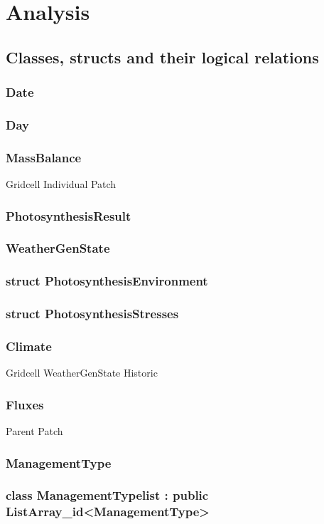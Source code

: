\section{Analysis}
\subsection{Classes, structs and their logical relations}

\subsubsection{Date}
\subsubsection{Day}
\subsubsection{MassBalance}
Gridcell
Individual
Patch
\subsubsection{PhotosynthesisResult}
\subsubsection{WeatherGenState}
\subsubsection{struct PhotosynthesisEnvironment}
\subsubsection{struct PhotosynthesisStresses}
\subsubsection{Climate}
Gridcell
WeatherGenState
Historic

\subsubsection{Fluxes}
Parent Patch
\subsubsection{ManagementType}
\subsubsection{class ManagementTypelist : public ListArray_id<ManagementType>}

